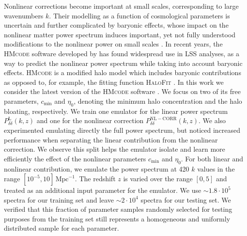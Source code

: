 \documentclass[fleqn,usenatbib]{mnras}
\begin{document}
Nonlinear corrections become important at small scales, corresponding to large wavenumbers $k$. Their modelling as a function of cosmological parameters is uncertain and further complicated by baryonic effects, whose impact on the nonlinear matter power spectrum induces important, yet not fully understood modifications to the nonlinear power on small scales \citep[see e.g.][for a review]{Chisari19}. In recent years, the \textsc{HMcode} software developed by \citet{Mead15, Mead16, Mead21} has found widespread use in LSS analyses, as a way to predict the nonlinear power spectrum while taking into account baryonic effects. \textsc{HMcode} is a modified halo model which includes baryonic contributions as opposed to, for example, the fitting function \textsc{HaloFit} \citep{Smith03, Takahashi12, Bird12}. In this work we consider the latest version of the \textsc{HMcode} software \citep{Mead21}. We focus on two of its free parameters, $c_{\mathrm{min}}$ and $\eta_0$, denoting the minimum halo concentration and the halo bloating, respectively. We train one emulator for the linear power spectrum $P_{\delta \delta}^{\mathrm{L}} (k, z)$ and one for the nonlinear correction $P_{\delta \delta}^{\mathrm{NL-CORR}} (k, z)$. We also experimented emulating directly the full power spectrum, but noticed increased performance when separating the linear contribution from the nonlinear correction. We observe this split helps the emulator isolate and learn more efficiently the effect of the nonlinear parameters $c_{\mathrm{min}}$ and $\eta_0$. For both linear and nonlinear contribution, we emulate the power spectrum at 420 $k$ values in the range $[10^{-5}, 10] \, \mathrm{Mpc}^{-1}$. The redshift $z$ is varied over the range $[0, 5]$ and treated as an additional input parameter for the emulator. We use $\sim 1.8 \cdot 10^5$ spectra for our training set and leave $\sim 2 \cdot 10^4$ spectra for our testing set. We verified that this fraction of parameter samples randomly selected for testing purposes from the training set still represents a homogeneous and uniformly distributed sample for each parameter.
\end{document}
